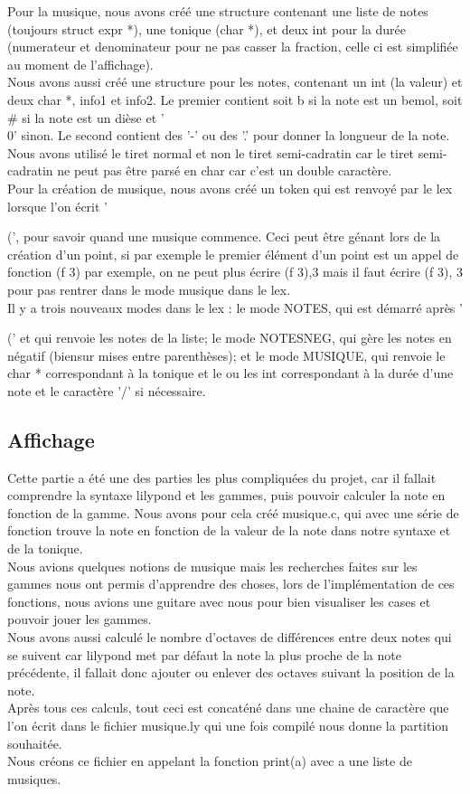 \documentclass{report}
\begin{document}
Pour la musique, nous avons créé une structure contenant une liste de notes (toujours struct expr *), une tonique (char *), et deux int pour la durée (numerateur et denominateur pour ne pas casser la fraction, celle ci est simplifiée au moment de l'affichage).\\
Nous avons aussi créé une structure pour les notes, contenant un int (la valeur) et deux char *, info1 et info2. Le premier contient soit b si la note est un bemol, soit \# si la note est un dièse et '\\0' sinon. Le second contient des '-' ou des '.' pour donner la longueur de la note. Nous avons utilisé le tiret normal et non le tiret semi-cadratin car le tiret semi-cadratin ne peut pas être parsé en char car c'est un double caractère.\\
Pour la création de musique, nous avons créé un token qui est renvoyé par le lex lorsque l'on écrit '{(', pour savoir quand une musique commence. Ceci peut être génant lors de la création d'un point, si par exemple le premier élément d'un point est un appel de fonction (f 3) par exemple, on ne peut plus écrire {(f 3),3} mais il faut écrire { (f 3), 3} pour pas rentrer dans le mode musique dans le lex.\\
Il y a trois nouveaux modes dans le lex : le mode NOTES, qui est démarré après '{(' et qui renvoie les notes de la liste; le mode NOTESNEG, qui gère les notes en négatif (biensur mises entre parenthèses); et le mode MUSIQUE, qui renvoie le char * correspondant à la tonique et le ou les int correspondant à la durée d'une note et le caractère '/' si nécessaire.

\subsection{Affichage}

Cette partie a été une des parties les plus compliquées du projet, car il fallait comprendre la syntaxe lilypond et les gammes, puis pouvoir calculer la note en fonction de la gamme. Nous avons pour cela créé musique.c, qui avec une série de fonction trouve la note en fonction de la valeur de la note dans notre syntaxe et de la tonique.\\
Nous avions quelques notions de musique mais les recherches faites sur les gammes nous ont permis d'apprendre des choses, lors de l'implémentation de ces fonctions, nous avions une guitare avec nous pour bien visualiser les cases et pouvoir jouer les gammes.\\
Nous avons aussi calculé le nombre d'octaves de différences entre deux notes qui se suivent car lilypond met par défaut la note la plus proche de la note précédente, il fallait donc ajouter ou enlever des octaves suivant la position de la note.\\
Après tous ces calculs, tout ceci est concaténé dans une chaine de caractère que l'on écrit dans le fichier musique.ly qui une fois compilé nous donne la partition souhaitée.\\
Nous créons ce fichier en appelant la fonction print(a) avec a une liste de musiques.

}}
\end{document}
